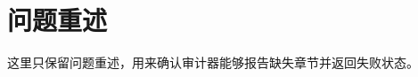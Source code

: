 \documentclass{ctexart}
\begin{document}
\begin{abstract}
本文给出一个故意缺少主要章节的审计反例。
\end{abstract}

\section{问题重述}
这里只保留问题重述，用来确认审计器能够报告缺失章节并返回失败状态。
\end{document}
